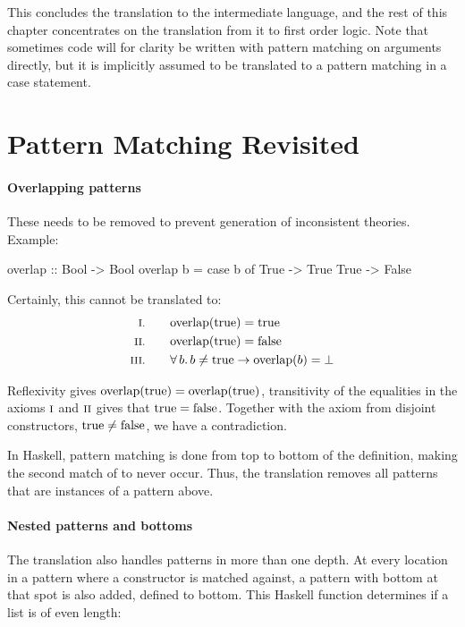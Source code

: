 This concludes the translation to the intermediate language, and the
rest of this chapter concentrates on the translation from it to first
order logic. Note that sometimes code will for clarity be written with pattern
matching on arguments directly, but it is implicitly assumed to be
translated to a pattern matching in a case statement.

\section{Pattern Matching Revisited}
\label{sec:patternsrevisited}

\paragraph{Overlapping patterns} These needs to be removed to prevent
generation of inconsistent theories. Example:

\begin{code}
overlap :: Bool -> Bool
overlap b = case b of
              True -> True
              True -> False
\end{code}

Certainly, this cannot be translated to:
\begin{align*}
\rom{1} \qquad & \fn{overlap}(\fn{true}) = \fn{true} \\
\rom{2} \qquad & \fn{overlap}(\fn{true}) = \fn{false} \\
\rom{3} \qquad & \fa{b} b \neq \fn{true} \rightarrow \fn{overlap}(b) = \bot
\end{align*}

Reflexivity gives $\mathrm{overlap}(\mathrm{true}) = \mathrm{overlap}(\mathrm{true})$,
transitivity of the equalities in the axioms $\romnodot{1}$ and
$\romnodot{2}$ gives that $\mathrm{true} = \mathrm{false}$. Together with the
axiom from disjoint constructors, $\mathrm{true} \neq \mathrm{false}$, we have
a contradiction.

In Haskell, pattern matching is done from top to bottom of the
definition, making the second match of  to never occur. Thus,
the translation removes all patterns that are instances of a pattern
above.



\paragraph{Nested patterns and bottoms} The translation also handles
patterns in more than one depth. At every location in a pattern where
a constructor is matched against, a pattern with bottom at that spot
is also added, defined to bottom. This Haskell function 
determines if a list is of even length:

